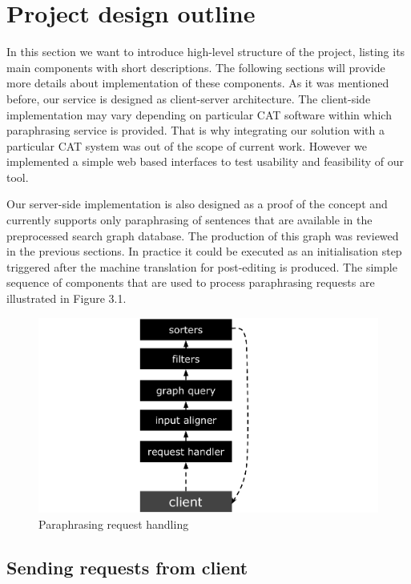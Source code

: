 \section{Project design outline}

In this section we want to introduce high-level structure of the project, listing its main components with short descriptions. The following sections will provide more details about implementation of these components. As it was mentioned before, our service is designed as client-server architecture. The client-side implementation may vary depending on particular CAT software within which paraphrasing service is provided.
That is why integrating our solution with a particular CAT system was out of the scope of current work. However we implemented a simple web based interfaces to test usability and feasibility of our tool. 

Our server-side implementation is also designed as a proof of the concept and currently supports only paraphrasing of sentences that are available in the preprocessed search graph database. The production of this graph was reviewed in the previous sections. In practice it could be executed as an initialisation step triggered after the machine translation for post-editing is produced. The simple sequence of components that are used to process paraphrasing requests are illustrated in Figure 3.1.

\begin{figure}
 \centering 
 \includegraphics{g/system-outline.pdf}
 \caption{Paraphrasing request handling}
\end{figure}

\subsection{Sending requests from client}

